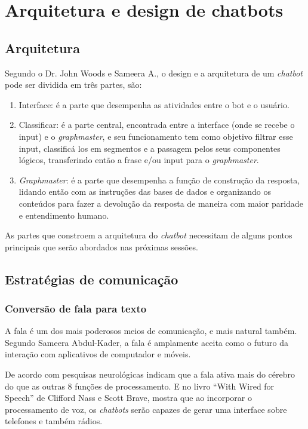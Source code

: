 \documentclass[
	12pt,				%
	oneside,
	a4paper,			%
	english,			%
	french,				%
	spanish,			%
	brazil				%
	]{abntex2}
\begin{document}
\chapter{Arquitetura e design de chatbots}

\section{Arquitetura}
Segundo o Dr. John Woods e Sameera A., o design e a arquitetura de um \emph{chatbot} pode ser dividida em três partes, são:

\begin{enumerate}
	\item Interface: é a parte que desempenha as atividades entre o bot e o usuário.
	\item Classificar: é a parte central, encontrada entre a interface (onde se recebe o input) e o \emph{graphmaster}, e seu funcionamento tem como objetivo filtrar esse input, classificá los em segmentos e a passagem pelos seus componentes lógicos, transferindo então a frase e/ou input para o \emph{graphmaster}.
	\item \emph{Graphmaster}: é a parte que desempenha a função de construção da resposta, lidando então com as instruções das bases de dados e organizando os conteúdos para fazer a devolução da resposta de maneira com maior paridade e entendimento humano.
\end{enumerate}

As partes que constroem a arquitetura do \emph{chatbot} necessitam de alguns pontos principais que serão abordados nas próximas sessões.

\section{Estratégias de comunicação}
\subsection{Conversão de fala para texto}
A fala é um dos mais poderosos meios de comunicação, e mais natural também. Segundo Sameera Abdul-Kader, a fala é amplamente aceita como o futuro da interação com aplicativos de computador e móveis.
 
De acordo com pesquisas neurológicas indicam que a fala ativa mais do cérebro do que as outras 8 funções de processamento. E no  livro “With Wired for Speech” de Clifford Nass e Scott Brave, mostra que ao incorporar o processamento de voz, os \emph{chatbots} serão capazes de gerar uma interface sobre telefones e também rádios.
 
\end{document}
